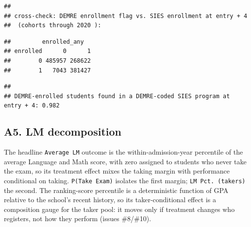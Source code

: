 \documentclass[
]{article}
\begin{document}
\begin{verbatim}
## 
## cross-check: DEMRE enrollment flag vs. SIES enrollment at entry + 4
##  (cohorts through 2020 ):
\end{verbatim}

\begin{verbatim}
##         enrolled_any
## enrolled      0      1
##        0 485957 268622
##        1   7043 381427
\end{verbatim}

\begin{verbatim}
## 
## DEMRE-enrolled students found in a DEMRE-coded SIES program at entry + 4: 0.982
\end{verbatim}

\begin{table}[htbp]
   \caption{Regression Results (Replication)}\label{tab: headline replication}
   \centerline{}
\end{table}

\hypertarget{a5.-lm-decomposition}{%
\subsection{A5. LM decomposition}\label{a5.-lm-decomposition}}

The headline \texttt{Average\ LM} outcome is the within-admission-year
percentile of the average Language and Math score, with zero assigned to
students who never take the exam, so its treatment effect mixes the
taking margin with performance conditional on taking.
\texttt{P(Take\ Exam)} isolates the first margin;
\texttt{LM\ Pct.\ (takers)} the second. The ranking-score percentile is
a deterministic function of GPA relative to the school's recent history,
so its taker-conditional effect is a composition gauge for the taker
pool: it moves only if treatment changes who registers, not how they
perform (issues \#8/\#10).
\end{document}
